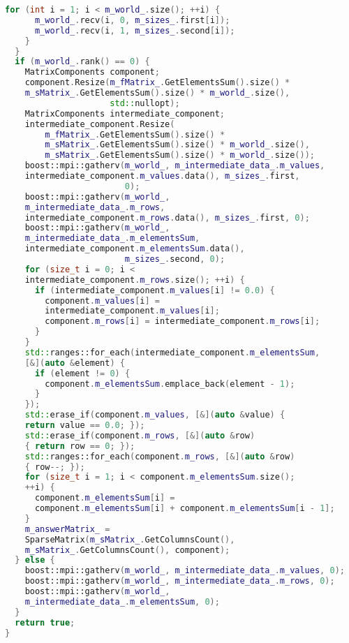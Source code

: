 \documentclass[12pt]{article}
\begin{document}
\begin{lstlisting}[language=C++]
    for (int i = 1; i < m_world_.size(); ++i) {
      m_world_.recv(i, 0, m_sizes_.first[i]);
      m_world_.recv(i, 1, m_sizes_.second[i]);
    }
  }
  if (m_world_.rank() == 0) {
    MatrixComponents component;
    component.Resize(m_fMatrix_.GetElementsSum().size() *
    m_sMatrix_.GetElementsSum().size() * m_world_.size(),
                     std::nullopt);
    MatrixComponents intermediate_component;
    intermediate_component.Resize(
        m_fMatrix_.GetElementsSum().size() * 
        m_sMatrix_.GetElementsSum().size() * m_world_.size(),
        m_sMatrix_.GetElementsSum().size() * m_world_.size());
    boost::mpi::gatherv(m_world_, m_intermediate_data_.m_values, 
    intermediate_component.m_values.data(), m_sizes_.first,
                        0);
    boost::mpi::gatherv(m_world_, 
    m_intermediate_data_.m_rows, 
    intermediate_component.m_rows.data(), m_sizes_.first, 0);
    boost::mpi::gatherv(m_world_, 
    m_intermediate_data_.m_elementsSum, 
    intermediate_component.m_elementsSum.data(),
                        m_sizes_.second, 0);
    for (size_t i = 0; i < 
    intermediate_component.m_rows.size(); ++i) {
      if (intermediate_component.m_values[i] != 0.0) {
        component.m_values[i] = 
        intermediate_component.m_values[i];
        component.m_rows[i] = intermediate_component.m_rows[i];
      }
    }
    std::ranges::for_each(intermediate_component.m_elementsSum, 
    [&](auto &element) {
      if (element != 0) {
        component.m_elementsSum.emplace_back(element - 1);
      }
    });
    std::erase_if(component.m_values, [&](auto &value) { 
    return value == 0.0; });
    std::erase_if(component.m_rows, [&](auto &row)
    { return row == 0; });
    std::ranges::for_each(component.m_rows, [&](auto &row)
    { row--; });
    for (size_t i = 1; i < component.m_elementsSum.size();
    ++i) {
      component.m_elementsSum[i] =
      component.m_elementsSum[i] + component.m_elementsSum[i - 1];
    }
    m_answerMatrix_ = 
    SparseMatrix(m_sMatrix_.GetColumnsCount(), 
    m_sMatrix_.GetColumnsCount(), component);
  } else {
    boost::mpi::gatherv(m_world_, m_intermediate_data_.m_values, 0);
    boost::mpi::gatherv(m_world_, m_intermediate_data_.m_rows, 0);
    boost::mpi::gatherv(m_world_, 
    m_intermediate_data_.m_elementsSum, 0);
  }
  return true;
}
\end{lstlisting}
\end{document}
